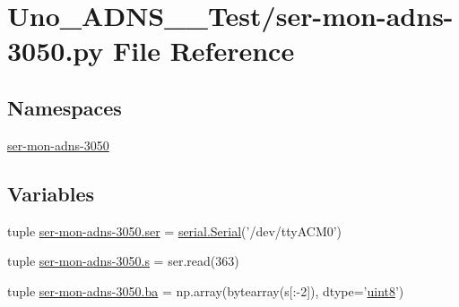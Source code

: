 \hypertarget{ser-mon-adns-3050_8py}{\section{Uno\-\_\-\-A\-D\-N\-S\-\_\-\_\-\-Test/ser-\/mon-\/adns-\/3050.py File Reference}
\label{ser-mon-adns-3050_8py}
}
\subsection*{Namespaces}
\begin{DoxyCompactItemize}
\item 
\hyperlink{namespaceser-mon-adns-3050}{ser-\/mon-\/adns-\/3050}
\end{DoxyCompactItemize}
\subsection*{Variables}
\begin{DoxyCompactItemize}
\item 
tuple \hyperlink{namespaceser-mon-adns-3050_aeb75b8d2274f52835b8a3c670650abc1}{ser-\/mon-\/adns-\/3050.\-ser} = \hyperlink{HardwareSerial_8h_a7b8c4a195c58f9eb8750e94955c5aa4b}{serial.\-Serial}('/dev/tty\-A\-C\-M0')
\item 
tuple \hyperlink{namespaceser-mon-adns-3050_a292f31fb2fd0e796b495e18bddd6371c}{ser-\/mon-\/adns-\/3050.\-s} = ser.\-read(363)
\item 
tuple \hyperlink{namespaceser-mon-adns-3050_a0e229bbf6215af5bfc987333a7c5d3ab}{ser-\/mon-\/adns-\/3050.\-ba} = np.\-array(bytearray(s\mbox{[}\-:-\/2\mbox{]}), dtype='\hyperlink{md5_8h_a2d25bcd37166cc98f0d823cdb8c553ef}{uint8}')
\end{DoxyCompactItemize}
